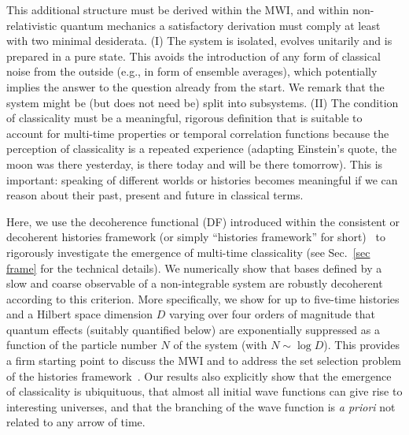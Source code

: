 \documentclass[pre,onecolumn,12pt,aps,longbibliography,nofootinbib]{revtex4-2}
\newcommand{\blue}[1]{#1}
\newcommand{\new}[1]{#1}
\begin{document}
This additional structure must be derived \new{within the MWI}, and within non-relativistic quantum mechanics a satisfactory derivation must comply at least with two minimal desiderata. (I) The system is isolated, evolves unitarily and is prepared in a pure state. This avoids the introduction of any form of classical noise from the outside (e.g., in form of ensemble averages), which potentially implies the answer to the question already from the start. We remark that the system might be (but does not need be) split into subsystems. (II) The condition of classicality must be a meaningful, rigorous definition that is suitable to account for {multi-time} properties or {temporal} correlation functions because the perception of classicality is a {repeated experience} (adapting Einstein's quote, the moon was there yesterday, is there today and will be there tomorrow). This is important: speaking of different worlds or histories becomes meaningful if we can reason about their past, present and future in classical terms.

Here, we use the decoherence functional (DF) introduced within the consistent or decoherent histories framework (or simply ``histories framework'' for short)~\cite{GriffithsJSP1984, GellMannHartleInBook1990, OmnesRMP1992, DowkerHalliwellPRD1992, GellMannHartlePRD1993, HalliwellANY1995, DowkerKentJSP1996, GriffithsBook2002, GellMannHartlePRA2007, Griffiths2019} \new{to} rigorous\new{ly investigate the emergence} of multi-time classicality (see Sec.~\ref{sec frame} for the technical details). We numerically show that bases defined by a slow and coarse observable of a non-integrable system \new{are robustly decoherent according to this criterion}. More specifically, we show for up to five-time histories and a Hilbert space dimension $D$ varying over four orders of magnitude that quantum effects (suitably quantified below) are {exponentially suppressed} as a function of the particle number $N$ of the system (with $N\sim\log D$). This provides a firm starting point to discuss the MWI \new{and to address the set selection problem of the histories framework~\cite{PazZurekPRD1993, DowkerKentPRL1995, DowkerKentJSP1996, RiedelZurekZwolakPRA2016}.} \blue{Our results also explicitly show} that the emergence of classicality is ubiquituous, that almost all initial wave functions \new{{can}} give rise to interesting universes, and that the branching of the wave function is \emph{a priori} not related to any arrow of time.
\end{document}
